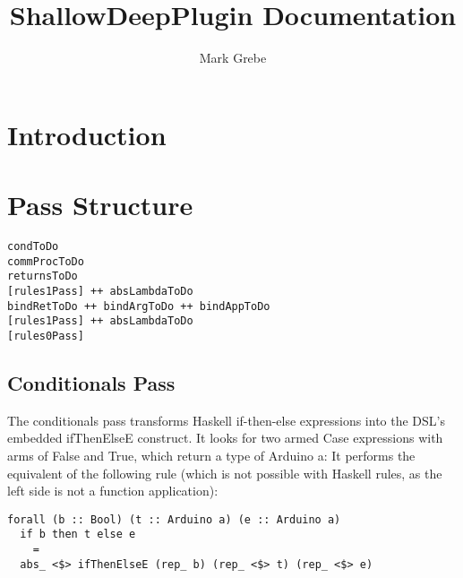 \documentclass[11pt, oneside]{article}   	%
\title{ShallowDeepPlugin Documentation}
\author{Mark Grebe}
\begin{document}
\maketitle

\section{Introduction}

\section{Pass Structure}


\begin{verbatim}
condToDo 
commProcToDo
returnsToDo
[rules1Pass] ++ absLambdaToDo  
bindRetToDo ++ bindArgToDo ++ bindAppToDo
[rules1Pass] ++ absLambdaToDo
[rules0Pass] 
\end{verbatim}

\subsection{Conditionals Pass}

The conditionals pass transforms Haskell if-then-else expressions into the DSL's
embedded ifThenElseE construct.  It looks for two armed Case expressions with
arms of False and True, which return a type of Arduino a:  It performs the equivalent
of the following rule (which is not possible with Haskell rules, as the left side is not
a function application):

\begin{verbatim}
forall (b :: Bool) (t :: Arduino a) (e :: Arduino a)
  if b then t else e
    =
  abs_ <$> ifThenElseE (rep_ b) (rep_ <$> t) (rep_ <$> e)
\end{verbatim}
\end{document}
